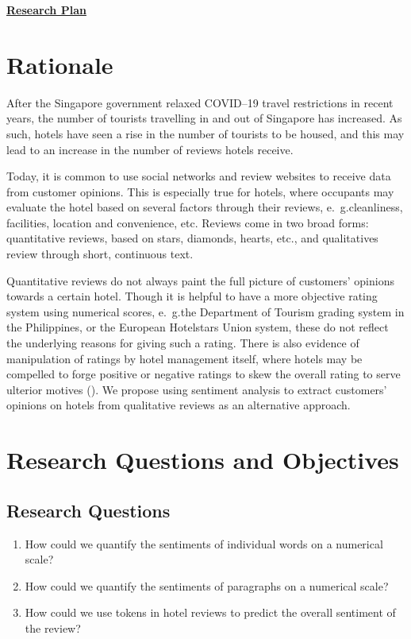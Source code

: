 \documentclass[
	fontsize=12pt,
	paper=a4,
	bibliography=totocnumbered
]{scrartcl}
\newcommand{\eg}{e.~g.\space}
\begin{document}
\pagestyle{scrheadings}

{
	\noindent
	\LARGE\textbf{\underline{Research Plan}}
}

\section{Rationale}

After the Singapore government relaxed COVID--19 travel restrictions in recent years,
the number of tourists travelling in and out of Singapore has increased.
As such, hotels have seen a rise in the number of tourists to be housed,
and this may lead to an increase in the number of reviews hotels receive.

Today, it is common to use social networks and review websites
to receive data from customer opinions. This is especially true for hotels,
where occupants may evaluate the hotel based on several factors through their
reviews, \eg cleanliness, facilities, location and convenience, etc.
Reviews come in two broad forms: quantitative reviews, based on stars, diamonds, hearts, etc., and
qualitatives review through short, continuous text.

Quantitative reviews do not always paint the full picture of customers'
opinions towards a certain hotel. Though it is helpful to have a more
objective rating system using numerical scores, \eg the Department of Tourism grading system in
the Philippines, or the European Hotelstars Union system,
these do not reflect the underlying reasons for giving such a rating.
There is also evidence of manipulation of ratings by hotel management itself, where hotels may be
compelled to forge positive or negative ratings to skew the overall rating to serve ulterior motives (\cite{tripadvisor}).
We propose using sentiment analysis to extract customers' opinions on hotels from qualitative reviews as an
alternative approach.

\section{Research Questions and Objectives}

\subsection{Research Questions}
\begin{enumerate}
	\item How could we quantify the sentiments of individual words on a numerical scale?
	\item How could we quantify the sentiments of paragraphs on a numerical scale?
	\item How could we use tokens in hotel reviews to predict the overall sentiment of the review?
\end{enumerate}
\end{document}
